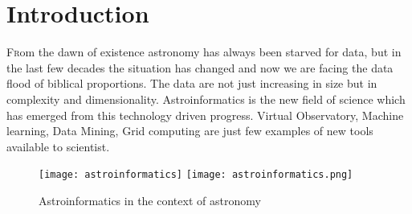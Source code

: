\chapter*{Introduction}


\renewcommand{\LettrineFontHook}{\color{red}}


\lettrine[lines = 3, loversize=-0.1, lraise=0.1]{F}rom the dawn of existence astronomy has always been starved for
data, but in the last few decades the situation has changed and now we
are facing the data flood of biblical proportions. The data are not
just increasing in size but in complexity and
dimensionality. \cite{ballastroinformatics} Astroinformatics is the
new field of science which has emerged from this technology driven
progress.  Virtual Observatory, Machine learning, Data Mining, Grid
computing are just few examples of new tools available to
scientist. 



\vspace{10pt}
\begin{figure}[!htbp]
  \begin{center}
    \leavevmode
    \ifpdf
    \texttt{[image: astroinformatics]}
    \else
    \texttt{[image: astroinformatics.png]}
    \fi
    \caption{Astroinformatics in the context of astronomy \cite{ballastroinformatics} }
    \label{FigAir}
  \end{center}
\end{figure}
\vspace{-10pt}



